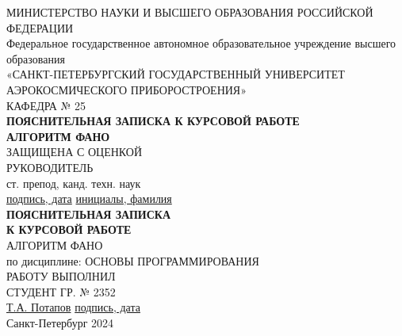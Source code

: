 \documentclass[a4paper,14pt]{article}
\begin{document}
\begin{titlepage}
\begin{center}
МИНИСТЕРСТВО НАУКИ И ВЫСШЕГО ОБРАЗОВАНИЯ РОССИЙСКОЙ ФЕДЕРАЦИИ\\
Федеральное государственное автономное образовательное учреждение высшего образования\\
«САНКТ-ПЕТЕРБУРГСКИЙ ГОСУДАРСТВЕННЫЙ УНИВЕРСИТЕТ АЭРОКОСМИЧЕСКОГО ПРИБОРОСТРОЕНИЯ»\\

\vspace{1cm}
КАФЕДРА № 25\\

\vspace{3cm}
\textbf{ПОЯСНИТЕЛЬНАЯ ЗАПИСКА
К КУРСОВОЙ РАБОТЕ}\\

\vspace{1cm}
\textbf{АЛГОРИТМ ФАНО}\\

\vspace{0.5cm}
ЗАЩИЩЕНА С ОЦЕНКОЙ\\

\vfill
РУКОВОДИТЕЛЬ\\
ст. препод, канд. техн. наук\\
\vspace{2cm}
\underline{подпись, дата} \hspace{5cm} \underline{инициалы, фамилия}\\

\vspace{3cm}
\textbf{ПОЯСНИТЕЛЬНАЯ ЗАПИСКА\\К КУРСОВОЙ РАБОТЕ}\\

\vspace{1cm}
АЛГОРИТМ ФАНО\\
\vspace{1cm}
по дисциплине: ОСНОВЫ ПРОГРАММИРОВАНИЯ\\

РАБОТУ ВЫПОЛНИЛ\\
СТУДЕНТ ГР. № 2352\\
\vspace{2cm}
\underline{Т.А. Потапов} \hspace{5cm} \underline{подпись, дата}\\

\vfill
Санкт-Петербург 2024
\end{center}
\end{titlepage}
\end{document}
